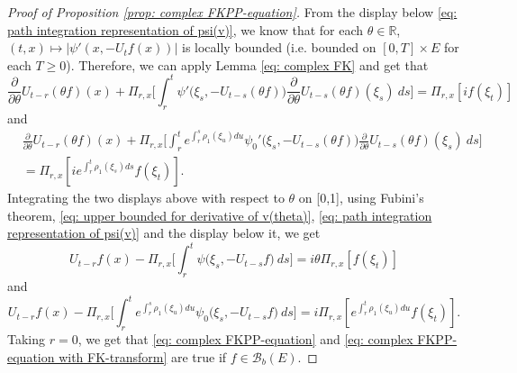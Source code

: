 \documentclass[12pt,a4paper]{amsart}
\theoremstyle{plain}
\theoremstyle{definition}
\numberwithin{equation}{section}
\begin{document}
\begin{proof}[Proof of Proposition \ref{prop: complex FKPP-equation}]
From the display below \eqref{eq: path integration representation of psi(v)},
     we know that for each $\theta\in \mathbb R$, $(t,x) \mapsto |\psi'(x,-U_tf(x))|$ is locally bounded (i.e. bounded on $[0,T]\times E$ for each $T \geq 0$).
    Therefore, we can apply Lemma \ref{eq: complex FK} and get that
\[
    \frac{\partial}{\partial \theta} U_{t-r}(\theta f)(x) + \Pi_{r,x} \Big[\int_r^t \psi'\big(\xi_s,- U_{t-s}(\theta f)\big)\frac{\partial}{\partial \theta} U_{t-s}(\theta f)(\xi_s)~ds\Big]
    = \Pi_{r,x} [i f(\xi_t)]
\]
    and
\begin{align}
    &\frac{\partial}{\partial \theta} U_{t-r}(\theta f)(x) + \Pi_{r,x} \Big[\int_r^t e^{\int_r^s \rho_1(\xi_u)du}\psi_0'\big(\xi_s,- U_{t-s}(\theta f)\big)\frac{\partial}{\partial \theta} U_{t-s}(\theta f)(\xi_s)~ds\Big]\\
    &= \Pi_{r,x} [i e^{\int_r^t \rho_1(\xi_s)ds}f(\xi_t)].
\end{align}
    Integrating the two displays above with respect to $\theta$  on [0,1], using 
Fubini's theorem,   \eqref{eq: upper bounded for derivative of v(theta)}, \eqref{eq: path integration representation of psi(v)} and the display below it, we get
\begin{equation}
    U_{t-r}f(x) - \Pi_{r,x} \Big[\int_r^t \psi\big(\xi_s,-U_{t-s}f\big) ~ds\Big]
    = i\theta \Pi_{r,x} [f(\xi_t)]
\end{equation}
    and
\begin{equation}
    U_{t-r}f(x) - \Pi_{r,x} \Big[\int_r^t e^{\int_r^s \rho_1(\xi_u)du} \psi_0\big(\xi_s,- U_{t-s}f\big) ~ds\Big]
    = i\Pi_{r,x} [e^{\int_r^t\rho_1(\xi_u)du}f(\xi_t)].
\end{equation}
    Taking $r = 0$, we get that \eqref{eq: complex FKPP-equation} and \eqref{eq: complex FKPP-equation with FK-transform} are true if $f\in \mathcal B_b(E)$.


\end{proof}
\end{document}
